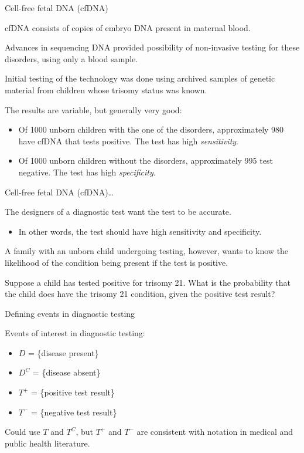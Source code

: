 \documentclass[ignorenonframetext,aspectratio=169]{beamer}
\providecommand{\tightlist}{%
  \setlength{\itemsep}{0pt}\setlength{\parskip}{0pt}}
\begin{document}
\begin{frame}{Cell-free fetal DNA (cfDNA)}

cfDNA consists of copies of embryo DNA present in maternal blood.

Advances in sequencing DNA provided possibility of non-invasive testing
for these disorders, using only a blood sample.

Initial testing of the technology was done using archived samples of
genetic material from children whose trisomy status was known.

The results are variable, but generally very good:

\begin{itemize}
\item
  Of 1000 unborn children with the one of the disorders, approximately
  980 have cfDNA that tests positive. The test has high
  \emph{sensitivity}.
\item
  Of 1000 unborn children without the disorders, approximately 995 test
  negative. The test has high \emph{specificity}.
\end{itemize}

\end{frame}

\begin{frame}{Cell-free fetal DNA (cfDNA)\ldots{}}

The designers of a diagnostic test want the test to be accurate.

\begin{itemize}
\tightlist
\item
  In other words, the test should have high sensitivity and specificity.
\end{itemize}

A family with an unborn child undergoing testing, however, wants to know
the likelihood of the condition being present if the test is positive.

Suppose a child has tested positive for trisomy 21. What is the
probability that the child does have the trisomy 21 condition, given the
positive test result?

\end{frame}

\begin{frame}{Defining events in diagnostic testing}

Events of interest in diagnostic testing:

\begin{itemize}
\item
  \(D\) = \{disease present\}
\item
  \(D^C\) = \{disease absent\}
\item
  \(T^+\) = \{positive test result\}
\item
  \(T^-\) = \{negative test result\}
\end{itemize}

\vspace{0.5cm}

Could use \(T\) and \(T^C\), but \(T^+\) and \(T^-\) are consistent with
notation in medical and public health literature.

\end{frame}
\end{document}

